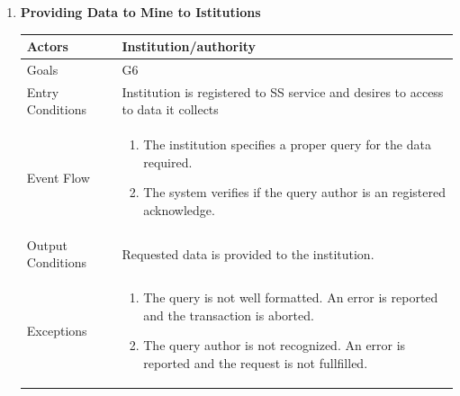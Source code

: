\begin{enumerate}
	\item \textbf{Providing Data to Mine to Istitutions}
		\begin{table}[h!]
		\begin{tabular}{|l|p{}|}
		\hline
		Actors            			&       	Institution/authority\\ \hline
		Goals             			&         	G6\\ \hline
		Entry Conditions  	&  		Institution is registered to SS service and desires to access to data it collects\\ \hline
		Event Flow        		&          
				\begin{enumerate}[label=\alph*)]
					\item The institution specifies a proper query for the data required.
					\item The system verifies if the query author is an registered acknowledge.
					\end{enumerate}\\ \hline
		Output Conditions &    		Requested data is provided to the institution. \\ \hline
		Exceptions        		&
		       	\begin{enumerate}[label=\alph*)]
		       		\item The query is not well formatted. An error is reported and the transaction is aborted.
		       		\item The query author is not recognized. An error is reported and the request is not fullfilled. 
		       	\end{enumerate}\\ \hline
	\end{tabular}
	\end{table}
	
		\clearpage
	

\end{enumerate}
